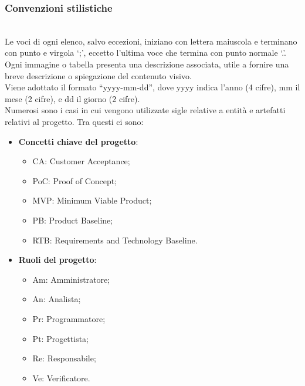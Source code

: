 \subsubsection{Convenzioni stilistiche}
\\
Le voci di ogni elenco, salvo eccezioni, iniziano con lettera maiuscola e terminano con punto e virgola `;', eccetto l'ultima voce che termina con punto normale `.'.
\\
Ogni immagine o tabella presenta una descrizione associata, utile a fornire una breve descrizione o spiegazione del contenuto visivo.
\\
Viene adottato il formato “yyyy-mm-dd”, dove yyyy indica l'anno (4 cifre), mm il mese (2 cifre), e dd il giorno (2 cifre).
\\
Numerosi sono i casi in cui vengono utilizzate sigle relative a entità e artefatti relativi al progetto. Tra questi ci sono:
\begin{itemize}
    \item \textbf{Concetti chiave del progetto}:
        \begin{itemize}
            \item CA: Customer Acceptance;
            \item PoC: Proof of Concept;
            \item MVP: Minimum Viable Product;
            \item PB: Product Baseline;
            \item RTB: Requirements and Technology Baseline.
        \end{itemize}
    \item \textbf{Ruoli del progetto}:
        \begin{itemize}
            \item Am: Amministratore;
            \item An: Analista;
            \item Pr: Programmatore;
            \item Pt: Progettista;
            \item Re: Responsabile;
            \item Ve: Verificatore.
        \end{itemize}
\end{itemize}

